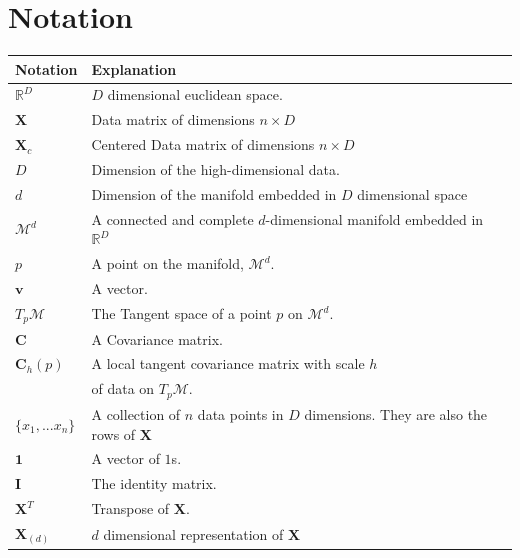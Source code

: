 \documentclass[12pt]{report}
\begin{document}
\newpage

\section{Notation}

\begin{table}[ht]
\begin{tabular}{|l|l|}
\hline
\textbf{Notation} & \textbf{Explanation}                                      \\ \hline
$\mathbb{R}^D$    & $D$ dimensional euclidean space.                      \\ \hline
$\mathbf{X}$        & Data matrix of dimensions $n \times D$               \\ \hline
$\mathbf{X}_c$        & Centered Data matrix of dimensions $n \times D$                \\ \hline
$D$                & Dimension of the high-dimensional data.                \\ \hline
$d$               & Dimension of the manifold embedded in $D$ dimensional space \\ \hline
$\mathcal{M}^d$    & A connected and complete $d$-dimensional manifold
                   embedded in $\mathbb{R}^D$                                 \\ \hline
$p$               & A point on the manifold, $\mathcal{M}^d$.            \\ \hline
$\mathbf{v}$        & A vector.                                         \\ \hline
$T_p\mathcal{M}$    & The Tangent space of a point $p$ on $\mathcal{M}^d$.   \\ \hline
$\mathbf{C}$        & A Covariance matrix.                               \\ \hline
$\mathbf{C}_h(p)$   & A local tangent covariance matrix with scale $h$ 
\\ & of data on $T_p\mathcal{M}$.    \\ \hline
$\{x_1,...x_n\}$  & A collection of $n$ data points in $D$ dimensions. 
They are also the rows of $\mathbf{X}$  \\ \hline
$\mathbf{1}$      & A vector of $1$s.                                   \\ \hline
$\mathbf{I}$      & The identity matrix.                               \\ \hline
$\mathbf{X}^T$    & Transpose of $\mathbf{X}$.                          \\ \hline
$\mathbf{X}_{(d)}$ & $d$ dimensional representation of $\mathbf{X}$      \\ \hline

\end{tabular}
\end{table}
\end{document}
